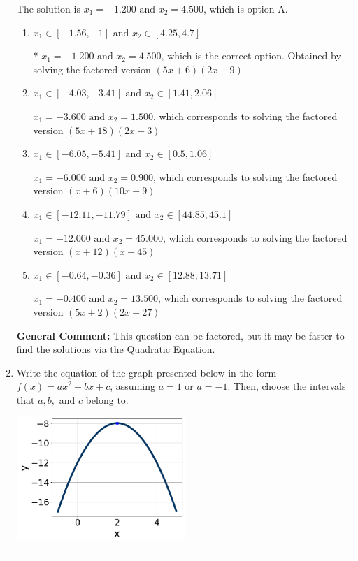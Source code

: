 \documentclass{extbook}[14pt]
\newcommand{\litem}[1]{\item #1

\rule{\textwidth}{0.4pt}}
\begin{document}
\begin{enumerate}
{The solution is \( x_1 = -1.200 \text{ and } x_2 = 4.500 \), which is option A.\begin{enumerate}[label=\Alph*.]
\item \( x_1 \in [-1.56, -1] \text{ and } x_2 \in [4.25, 4.7] \)

* $x_1 = -1.200 \text{ and } x_2 = 4.500$, which is the correct option. Obtained by solving the factored version $(5x + 6)(2x -9)$
\item \( x_1 \in [-4.03, -3.41] \text{ and } x_2 \in [1.41, 2.06] \)

$x_1 = -3.600 \text{ and } x_2 = 1.500$, which corresponds to solving the factored version $(5x + 18)(2x -3)$
\item \( x_1 \in [-6.05, -5.41] \text{ and } x_2 \in [0.5, 1.06] \)

$x_1 = -6.000 \text{ and } x_2 = 0.900$, which corresponds to solving the factored version $(x + 6)(10x -9)$
\item \( x_1 \in [-12.11, -11.79] \text{ and } x_2 \in [44.85, 45.1] \)

$x_1 = -12.000 \text{ and } x_2 = 45.000$, which corresponds to solving the factored version $(x + 12)(x -45)$
\item \( x_1 \in [-0.64, -0.36] \text{ and } x_2 \in [12.88, 13.71] \)

$x_1 = -0.400 \text{ and } x_2 = 13.500$, which corresponds to solving the factored version $(5x + 2)(2x -27)$
\end{enumerate}

\textbf{General Comment:} This question can be factored, but it may be faster to find the solutions via the Quadratic Equation.
}
\litem{
Write the equation of the graph presented below in the form $f(x)=ax^2+bx+c$, assuming  $a=1$ or $a=-1$. Then, choose the intervals that $a, b,$ and $c$ belong to.

\begin{center}
    \includegraphics[width=0.5\textwidth]{../Figures/quadraticGraphToEquationCopyB.png}
\end{center}




}
\end{enumerate}
\end{document}
